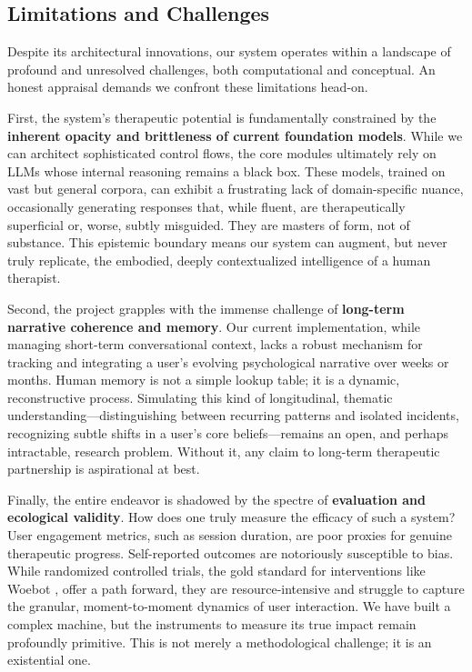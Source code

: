 \subsection{Limitations and Challenges}

Despite its architectural innovations, our system operates within a landscape of profound and unresolved challenges, both computational and conceptual. An honest appraisal demands we confront these limitations head-on.

First, the system's therapeutic potential is fundamentally constrained by the \textbf{inherent opacity and brittleness of current foundation models}. While we can architect sophisticated control flows, the core modules ultimately rely on LLMs whose internal reasoning remains a black box. These models, trained on vast but general corpora, can exhibit a frustrating lack of domain-specific nuance, occasionally generating responses that, while fluent, are therapeutically superficial or, worse, subtly misguided. They are masters of form, not of substance. This epistemic boundary means our system can augment, but never truly replicate, the embodied, deeply contextualized intelligence of a human therapist.

Second, the project grapples with the immense challenge of \textbf{long-term narrative coherence and memory}. Our current implementation, while managing short-term conversational context, lacks a robust mechanism for tracking and integrating a user's evolving psychological narrative over weeks or months. Human memory is not a simple lookup table; it is a dynamic, reconstructive process. Simulating this kind of longitudinal, thematic understanding—distinguishing between recurring patterns and isolated incidents, recognizing subtle shifts in a user's core beliefs—remains an open, and perhaps intractable, research problem. Without it, any claim to long-term therapeutic partnership is aspirational at best.

Finally, the entire endeavor is shadowed by the spectre of \textbf{evaluation and ecological validity}. How does one truly measure the efficacy of such a system? User engagement metrics, such as session duration, are poor proxies for genuine therapeutic progress. Self-reported outcomes are notoriously susceptible to bias. While randomized controlled trials, the gold standard for interventions like Woebot \cite{fitzpatrick2017}, offer a path forward, they are resource-intensive and struggle to capture the granular, moment-to-moment dynamics of user interaction. We have built a complex machine, but the instruments to measure its true impact remain profoundly primitive. This is not merely a methodological challenge; it is an existential one.

